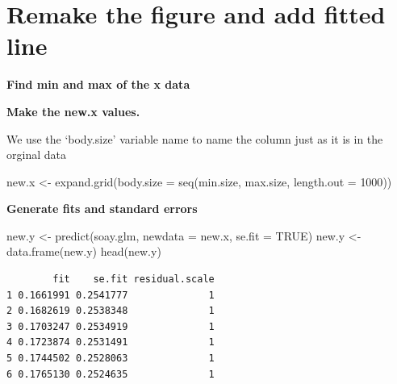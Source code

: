 \documentclass[
  letterpaper,
  DIV=11,
  numbers=noendperiod]{scrreprt}
\newenvironment{Shaded}{\begin{snugshade}}{\end{snugshade}}
\newcommand{\AttributeTok}[1]{\textcolor[rgb]{0.40,0.45,0.13}{#1}}
\newcommand{\ConstantTok}[1]{\textcolor[rgb]{0.56,0.35,0.01}{#1}}
\newcommand{\DecValTok}[1]{\textcolor[rgb]{0.68,0.00,0.00}{#1}}
\newcommand{\FunctionTok}[1]{\textcolor[rgb]{0.28,0.35,0.67}{#1}}
\newcommand{\NormalTok}[1]{\textcolor[rgb]{0.00,0.23,0.31}{#1}}
\newcommand{\OtherTok}[1]{\textcolor[rgb]{0.00,0.23,0.31}{#1}}
\newcommand{\SpecialCharTok}[1]{\textcolor[rgb]{0.37,0.37,0.37}{#1}}
\begin{document}
\section{Remake the figure and add fitted
line}\label{remake-the-figure-and-add-fitted-line}

\textbf{Find min and max of the x data}

\begin{Shaded}
\end{Shaded}

\textbf{Make the new.x values.}

We use the `body.size' variable name to name the column just as it is in
the orginal data

\begin{Shaded}
\begin{Highlighting}[]
\NormalTok{new.x }\OtherTok{\textless{}{-}} \FunctionTok{expand.grid}\NormalTok{(}\AttributeTok{body.size =} \FunctionTok{seq}\NormalTok{(min.size, max.size, }\AttributeTok{length.out =} \DecValTok{1000}\NormalTok{))}
\end{Highlighting}
\end{Shaded}

\textbf{Generate fits and standard errors}

\begin{Shaded}
\begin{Highlighting}[]
\NormalTok{new.y }\OtherTok{\textless{}{-}} \FunctionTok{predict}\NormalTok{(soay.glm, }\AttributeTok{newdata =}\NormalTok{ new.x, }\AttributeTok{se.fit =} \ConstantTok{TRUE}\NormalTok{)}
\NormalTok{new.y }\OtherTok{\textless{}{-}} \FunctionTok{data.frame}\NormalTok{(new.y)}
\FunctionTok{head}\NormalTok{(new.y)}
\end{Highlighting}
\end{Shaded}

\begin{verbatim}
        fit    se.fit residual.scale
1 0.1661991 0.2541777              1
2 0.1682619 0.2538348              1
3 0.1703247 0.2534919              1
4 0.1723874 0.2531491              1
5 0.1744502 0.2528063              1
6 0.1765130 0.2524635              1
\end{verbatim}
\end{document}
